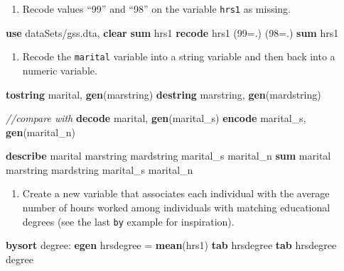 \documentclass[
]{book}
\newenvironment{Shaded}{\begin{snugshade}}{\end{snugshade}}
\newcommand{\CommentTok}[1]{\textcolor[rgb]{0.56,0.35,0.01}{\textit{#1}}}
\newcommand{\KeywordTok}[1]{\textcolor[rgb]{0.13,0.29,0.53}{\textbf{#1}}}
\newcommand{\NormalTok}[1]{#1}
\providecommand{\tightlist}{%
  \setlength{\itemsep}{0pt}\setlength{\parskip}{0pt}}
\begin{document}
\begin{alert}

\begin{enumerate}
\def\labelenumi{\arabic{enumi}.}
\tightlist
\item
  Recode values ``99'' and ``98'' on the variable \texttt{hrs1} as missing.
\end{enumerate}

\begin{Shaded}
\begin{Highlighting}[]
\KeywordTok{use}\NormalTok{ dataSets/gss.dta, }\KeywordTok{clear}
\KeywordTok{sum}\NormalTok{ hrs1}
\KeywordTok{recode}\NormalTok{ hrs1 (99=.) (98=.) }
\KeywordTok{sum}\NormalTok{ hrs1}
\end{Highlighting}
\end{Shaded}

\begin{enumerate}
\def\labelenumi{\arabic{enumi}.}
\setcounter{enumi}{1}
\tightlist
\item
  Recode the \texttt{marital} variable into a string variable and then back into a numeric variable.
\end{enumerate}

\begin{Shaded}
\begin{Highlighting}[]
\KeywordTok{tostring}\NormalTok{ marital, }\KeywordTok{gen}\NormalTok{(marstring)}
\KeywordTok{destring}\NormalTok{ marstring, }\KeywordTok{gen}\NormalTok{(mardstring)}

\CommentTok{//compare with}
\KeywordTok{decode}\NormalTok{ marital, }\KeywordTok{gen}\NormalTok{(marital\_s)}
\KeywordTok{encode}\NormalTok{ marital\_s, }\KeywordTok{gen}\NormalTok{(marital\_n)}

\KeywordTok{describe}\NormalTok{ marital marstring mardstring marital\_s marital\_n}
\KeywordTok{sum}\NormalTok{ marital marstring mardstring marital\_s marital\_n}
\end{Highlighting}
\end{Shaded}

\begin{enumerate}
\def\labelenumi{\arabic{enumi}.}
\setcounter{enumi}{2}
\tightlist
\item
  Create a new variable that associates each individual with the average number of hours worked among individuals with matching educational degrees (see the last \texttt{by} example for inspiration).
\end{enumerate}

\begin{Shaded}
\begin{Highlighting}[]
\KeywordTok{bysort}\NormalTok{ degree: }\KeywordTok{egen}\NormalTok{ hrsdegree = }\KeywordTok{mean}\NormalTok{(hrs1)}
\KeywordTok{tab}\NormalTok{ hrsdegree}
\KeywordTok{tab}\NormalTok{ hrsdegree degree }
\end{Highlighting}
\end{Shaded}

\end{alert}
\end{document}
